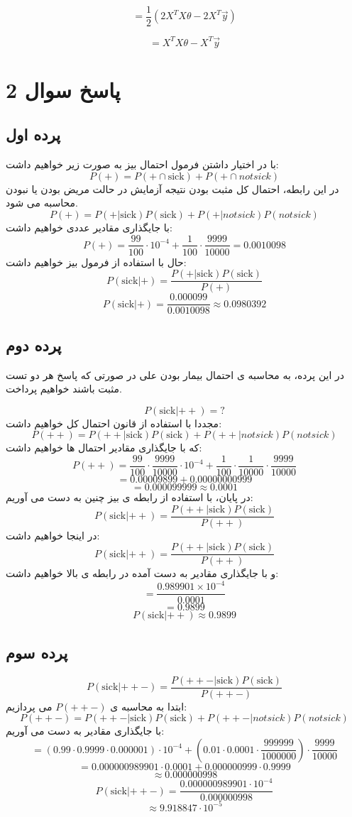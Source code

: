 \[
= \frac{1}{2} \left( 2X^T X\theta - 2X^T\vec{y} \right)
\]

\[
= X^T X\theta - X^T\vec{y}
\]

\section{پاسخ سوال 2}
\subsection{پرده اول}
با در اختیار داشتن فرمول احتمال بیز به صورت زیر خواهیم داشت:
\[
P(+) = P(+ \cap \text{sick}) + P(+ \cap \text{$not sick$})
\]
در این رابطه، احتمال کل مثبت بودن نتیجه آزمایش در حالت مریض بودن یا نبودن محاسبه می شود. 
\[
P(+) = P(+ | \text{sick}) P(\text{sick}) + P(+ | \text{$not sick$}) P(\text{$not sick$})
\]
با جایگذاری مقادیر عددی خواهیم داشت:
\[
P(+) = \frac{99}{100} \cdot 10^{-4} + \frac{1}{100} \cdot \frac{9999}{10000} = 0.0010098
\]
حال با استفاده از فرمول بیز خواهیم داشت:
\[
P(\text{sick} | +) = \frac{P(+ | \text{sick}) P(\text{sick})}{P(+)}
\]
\[
P(\text{sick} | +) = \frac{0.000099}{0.0010098} \approx 0.0980392
\]

\subsection{پرده دوم}
در این پرده، به محاسبه ی احتمال بیمار بودن علی در صورتی که پاسخ هر دو تست مثبت باشند خواهیم پرداخت.

\[
P(\text{sick} | ++) = ?
\]
مجددا با استفاده از قانون احتمال کل خواهیم داشت:
\[
P(++) = P(++ | \text{sick}) P(\text{sick}) + P(++ | \text{$not sick$}) P(\text{$not sick$})
\]
که با جایگذاری مقادیر احتمال ها خواهیم داشت:
\[
P(++) = \frac{99}{100} \cdot \frac{9999}{10000} \cdot 10^{-4} + \frac{1}{100} \cdot \frac{1}{10000} \cdot \frac{9999}{10000}
\]
\[
= 0.00009899 + 0.00000000999
\]
\[
= 0.000099999 \approx 0.0001
\]
در پایان، با استفاده از رابطه ی بیز چنین به دست می آوریم:
\[
P(\text{sick} | ++) = \frac{P(++ | \text{sick}) P(\text{sick})}{P(++)}
\]
در اینجا خواهیم داشت:
\[
P(\text{sick} | ++) = \frac{P(++ | \text{sick}) P(\text{sick})}{P(++)}
\]
و با جایگذاری مقادیر به دست آمده در رابطه ی بالا خواهیم داشت:
\[
= \frac{0.989901 \times 10^{-4}}{0.0001}
\]
\[
= 0.9899
\]
\[
P(\text{sick} | ++) \approx 0.9899
\]
\subsection{پرده سوم}
\[
P(\text{sick} | ++-) = \frac{P(++- | \text{sick}) P(\text{sick})}{P(++-)}
\]
ابتدا به محاسبه ی  \( P(++-) \) می پردازیم:
\[
P(++-) = P(++- | \text{sick}) P(\text{sick}) + P(++- | \text{$not sick$}) P(\text{$not sick$})
\]
با جایگذاری مقادیر به دست می آوریم:
\[
= (0.99 \cdot 0.9999 \cdot 0.000001) \cdot 10^{-4} + (0.01 \cdot 0.0001 \cdot \frac{999999}{1000000}) \cdot \frac{9999}{10000}
\]
\[
= 0.000000989901 \cdot 0.0001 + 0.000000999 \cdot 0.9999
\]
\[
\approx 0.000000998
\]
\[
P(\text{sick} | ++-) = \frac{0.000000989901 \cdot 10^{-4}}{0.000000998}
\]
\[
\approx 9.918847 \cdot 10^{-5}
\]
